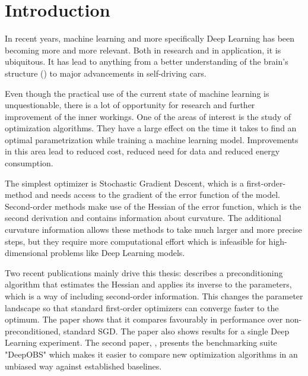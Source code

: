 \documentclass[twoside,12pt,a4paper]{report}
\begin{document}

\renewcommand{\baselinestretch}{1.3}
\small\normalsize

\tableofcontents

\renewcommand{\baselinestretch}{1}
\small\normalsize

\cleardoublepage


\setcounter{page}{1}


\chapter{Introduction} %
In recent years, machine learning and more specifically Deep Learning has been becoming more and more relevant. Both in research and in application, it is ubiquitous. It has lead to anything from a better understanding of the brain's structure (\cite{brown2016machine}) to major advancements in self-driving cars.

Even though the practical use of the current state of machine learning is unquestionable, there is a lot of opportunity for research and further improvement of the inner workings. One of the areas of interest is the study of optimization algorithms. They have a large effect on the time it takes to find an optimal parametrization while training a machine learning model. Improvements in this area lead to reduced cost, reduced need for data and reduced energy consumption.

The simplest optimizer is Stochastic Gradient Descent, which is a first-order-method and needs access to the gradient of the error function of the model. Second-order methods make use of the Hessian of the error function, which is the second derivation and contains information about curvature. The additional curvature information allows these methods to take much larger and more precise steps, but they require more computational effort which is infeasible for high-dimensional problems like Deep Learning models.

Two recent publications mainly drive this thesis: \cite{roos2019active} describes a preconditioning algorithm that estimates the Hessian and applies its inverse to the parameters, which is a way of including second-order information. This changes the parameter landscape so that standard first-order optimizers can converge faster to the optimum. The paper shows that it compares favourably in performance over non-preconditioned, standard SGD. The paper also shows results for a single Deep Learning experiment.
The second paper, \cite{deepobs}, presents the benchmarking suite "DeepOBS" which makes it easier to compare new optimization algorithms in an unbiased way against established baselines.
\end{document}
